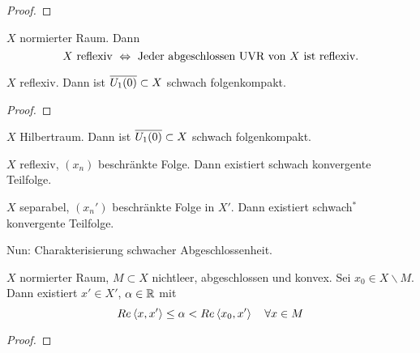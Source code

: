 
	\begin{proof}
		\todor
	\end{proof}

	\begin{lemma}
	\label{lem:3.33}
		$X$ normierter Raum. Dann 
			$$ X \text{ reflexiv } \overset{}{\Leftrightarrow} \text{ Jeder abgeschlossen UVR von } X \text{ ist reflexiv}.$$
	\end{lemma}

	\begin{hinweise}
	\end{hinweise}

	\begin{thm}
	\label{cor:3.34}
		$X$ reflexiv. Dann ist $\overline{U_{1}(0)} \subset X$ schwach folgenkompakt.
	\end{thm}
	
	\begin{proof}
		\todor	
	\end{proof}

	\begin{cor}
	\label{cor:3.35}
		$X$ Hilbertraum. Dann ist $\overline{U_{1}(0)} \subset X$ schwach folgenkompakt.
	\end{cor}

	\begin{cor}
	\label{cor:3.36}
		$X$ reflexiv, $(x_n)$ beschränkte Folge. Dann existiert schwach konvergente Teilfolge.
	\end{cor}

	\begin{cor}
	\label{cor:3.37}
		$X$ separabel, $(x_n')$ beschränkte Folge in $X'$. Dann existiert schwach$^*$ konvergente Teilfolge.
	\end{cor}

	Nun: Charakterisierung schwacher Abgeschlossenheit.
	
	\begin{thm}[Trennungssatz]
	\label{thm:3.38}
		$X$ normierter Raum, $M \subset X$ nichtleer, abgeschlossen und konvex. Sei $x_0 \in X\backslash M$. Dann existiert $x' \in X'$, $\alpha\in \mathbb{R}$ mit
			$$Re\left \langle x,x' \right \rangle \leq \alpha < Re\left \langle x_0, x' \right \rangle \quad \forall x\in M$$
	\end{thm}
	\begin{proof}
		\todor	
	\end{proof}

